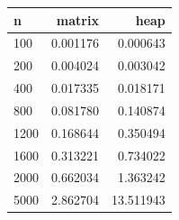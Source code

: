 \begin{tabular}{lrr}
\hline
n & matrix & heap \\
\hline
100 & 0.001176 & 0.000643 \\
200 & 0.004024 & 0.003042 \\
400 & 0.017335 & 0.018171 \\
800 & 0.081780 & 0.140874 \\
1200 & 0.168644 & 0.350494 \\
1600 & 0.313221 & 0.734022 \\
2000 & 0.662034 & 1.363242 \\
5000 & 2.862704 & 13.511943 \\
\hline
\end{tabular}
